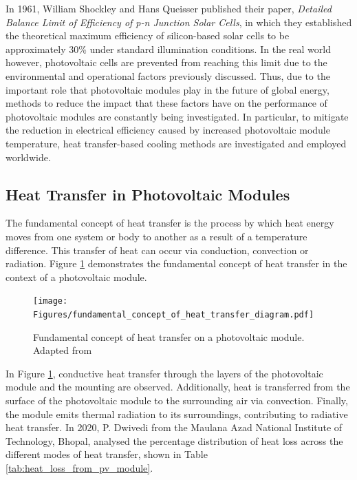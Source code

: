 In 1961, William Shockley and Hans Queisser published their paper, \textit{Detailed Balance Limit of Efficiency of p-n Junction Solar Cells}, in which they established the theoretical maximum efficiency of silicon-based solar cells to be approximately 30\% under standard illumination conditions. \cite{Shockley1961DetailedCells} In the real world however, photovoltaic cells are prevented from reaching this limit due to the environmental and operational factors previously discussed. Thus, due to the important role that photovoltaic modules play in the future of global energy, methods to reduce the impact that these factors have on the performance of photovoltaic modules are constantly being investigated. In particular, to mitigate the reduction in electrical efficiency caused by increased photovoltaic module temperature, heat transfer-based cooling methods are investigated and employed worldwide.\vspace{0.5em}

\pagebreak
\subsection{Heat Transfer in Photovoltaic Modules}
The fundamental concept of heat transfer is the process by which heat energy moves from one system or body to another as a result of a temperature difference. This transfer of heat can occur via conduction, convection or radiation. Figure \ref{fig:fundamental_concept_of_heat_transfer_diagram} demonstrates the fundamental concept of heat transfer in the context of a photovoltaic module.\vspace{0.5em}

\begin{figure}[h]
    \centering
    \texttt{[image: Figures/fundamental\_concept\_of\_heat\_transfer\_diagram.pdf]}
    \caption{Fundamental concept of heat transfer on a photovoltaic module. Adapted from \cite{HonsbergHeatModules}}
    \label{fig:fundamental_concept_of_heat_transfer_diagram}
\end{figure}

In Figure \ref{fig:fundamental_concept_of_heat_transfer_diagram}, conductive heat transfer through the layers of the photovoltaic module and the mounting are observed. Additionally, heat is transferred from the surface of the photovoltaic module to the surrounding air via convection. Finally, the module emits thermal radiation to its surroundings, contributing to radiative heat transfer. In 2020, P. Dwivedi from the Maulana Azad National Institute of Technology, Bhopal, analysed the percentage distribution of heat loss across the different modes of heat transfer, shown in Table \ref{tab:heat_loss_from_pv_module}. \cite{Dwivedi2020AdvancedArt}

